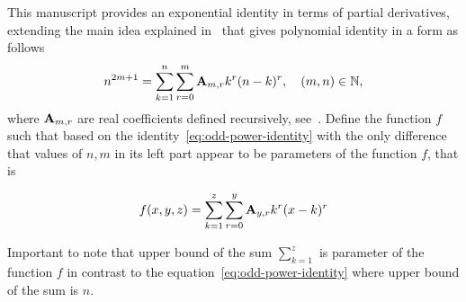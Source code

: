 This manuscript provides an exponential identity in terms of partial derivatives,
extending the main idea explained in~\cite{kolosov_2022} that gives polynomial identity in a form as follows
\begin{equation}
    n^{2m+1} = \sum_{k=1}^{n} \sum_{r=0}^{m} {\mathbf{A}} \sb{m,r} k^r (n-k)^r, \quad (m,n) \in \mathbb{N},
    \label{eq:odd-power-identity}
\end{equation}
where ${\mathbf{A}} \sb{m,r}$ are real coefficients defined recursively, see~\cite{kolosov2016link}.
Define the function $f$ such that based on the identity~\eqref{eq:odd-power-identity} with the only difference that
values of $n, m$ in its left part appear to be parameters of the function $f$, that is
\begin{definition}
    \begin{equation}
        f(x, y, z) = \sum_{k=1}^{z} \sum_{r=0}^{y} {\mathbf{A}} \sb{y,r} k^r (x-k)^r\label{eq:definition-f}
    \end{equation}
\end{definition}
Important to note that upper bound of the sum $\sum_{k=1}^{z}$ is parameter of the function $f$ in contrast
to the equation~\eqref{eq:odd-power-identity} where upper bound of the sum is $n$.